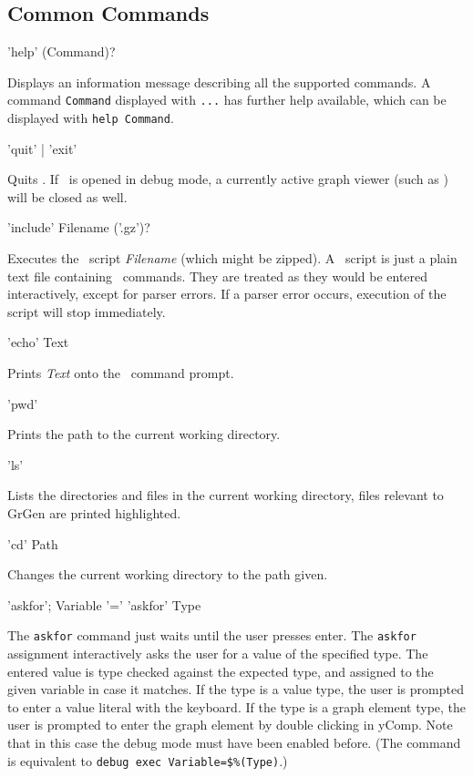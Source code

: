 \subsection{Common Commands}
\label{commcommands}
\begin{rail}
  'help' (Command)?
\end{rail}
Displays an information message describing all the supported commands.
A command \texttt{Command} displayed with \texttt{...} has further help available, which can be displayed with \texttt{help Command}.

\begin{rail}
  'quit' | 'exit'
\end{rail}
Quits \GrShell. If \GrShell\ is opened in debug mode, a currently active graph viewer (such as \yComp) will be closed as well.

\begin{rail}
  'include' Filename ('.gz')?
\end{rail}
Executes the \GrShell\ script \emph{Filename} (which might be zipped).
A \GrShell\ script is just a plain text file containing \GrShell\ commands.
They are treated as they would be entered interactively, except for parser errors.
If a parser error occurs, execution of the script will stop immediately.

\begin{rail}
  'echo' Text
\end{rail}
Prints \emph{Text} onto the \GrShell\ command prompt.

\begin{rail}
  'pwd'
\end{rail}
Prints the path to the current working directory.

\begin{rail}
  'ls'
\end{rail}
Lists the directories and files in the current working directory, files relevant to GrGen are printed highlighted.

\begin{rail}
  'cd' Path
\end{rail}
Changes the current working directory to the path given.

\begin{rail}
  'askfor';
  Variable '=' 'askfor' Type
\end{rail}
The \texttt{askfor} command just waits until the user presses enter.
The \texttt{askfor} assignment interactively asks the user for a value of the specified type.
The entered value is type checked against the expected type, and assigned to the given variable in case it matches.
If the type is a value type, the user is prompted to enter a value literal with the keyboard.
If the type is a graph element type, the user is prompted to enter the graph element by double clicking in yComp.
Note that in this case the debug mode must have been enabled before.
(The command is equivalent to \verb#debug exec Variable=$%(Type)#.)

